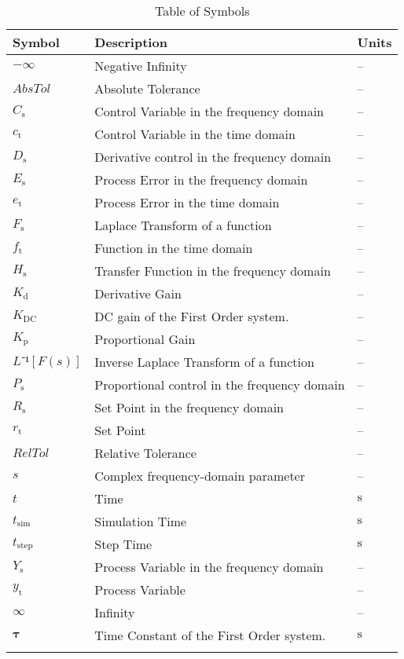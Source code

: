 \documentclass[12pt]{article}
\begin{document}
\begin{longtable}{l l l}
\toprule
\textbf{Symbol} & \textbf{Description} & \textbf{Units}
\\
\midrule
\endhead
$-∞$ & Negative Infinity & --
\\
$AbsTol$ & Absolute Tolerance & --
\\
${C_{\text{s}}}$ & Control Variable in the frequency domain & --
\\
${c_{\text{t}}}$ & Control Variable in the time domain & --
\\
${D_{\text{s}}}$ & Derivative control in the frequency domain & --
\\
${E_{\text{s}}}$ & Process Error in the frequency domain & --
\\
${e_{\text{t}}}$ & Process Error in the time domain & --
\\
${F_{\text{s}}}$ & Laplace Transform of a function & --
\\
${f_{\text{t}}}$ & Function in the time domain & --
\\
${H_{\text{s}}}$ & Transfer Function in the frequency domain & --
\\
${K_{\text{d}}}$ & Derivative Gain & --
\\
${K_{\text{DC}}}$ & DC gain of the First Order system. & --
\\
${K_{\text{p}}}$ & Proportional Gain & --
\\
$L⁻¹[F(s)]$ & Inverse Laplace Transform of a function & --
\\
${P_{\text{s}}}$ & Proportional control in the frequency domain & --
\\
${R_{\text{s}}}$ & Set Point in the frequency domain & --
\\
${r_{\text{t}}}$ & Set Point & --
\\
$RelTol$ & Relative Tolerance & --
\\
$s$ & Complex frequency-domain parameter & --
\\
$t$ & Time & ${\text{s}}$
\\
${t_{\text{sim}}}$ & Simulation Time & ${\text{s}}$
\\
${t_{\text{step}}}$ & Step Time & ${\text{s}}$
\\
${Y_{\text{s}}}$ & Process Variable in the frequency domain & --
\\
${y_{\text{t}}}$ & Process Variable & --
\\
$∞$ & Infinity & --
\\
$𝛕$ & Time Constant of the First Order system. & ${\text{s}}$
\\
\bottomrule
\caption{Table of Symbols}
\label{Table:ToS}
\end{longtable}
\end{document}
